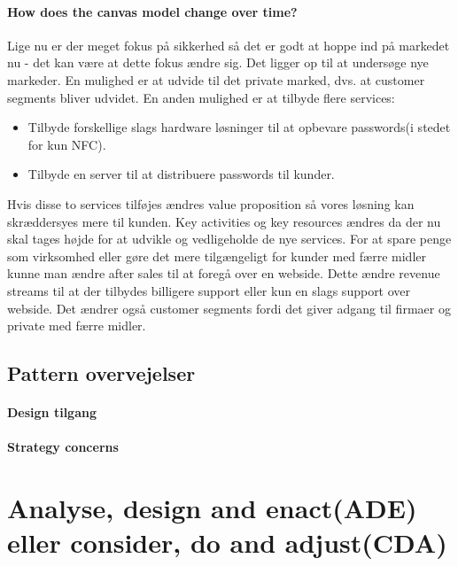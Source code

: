 \documentclass[a4paper]{article}
\begin{document}
\paragraph{How does the canvas model change over time?}
Lige nu er der meget fokus på sikkerhed så det er godt at hoppe ind på markedet nu - det kan være at dette fokus ændre sig.
Det ligger op til at undersøge nye markeder.
En mulighed er at udvide til det private marked, dvs. at customer segments bliver udvidet.
En anden mulighed er at tilbyde flere services:
\begin{itemize}
\item Tilbyde forskellige slags hardware løsninger til at opbevare passwords(i stedet for kun NFC).
\item Tilbyde en server til at distribuere passwords til kunder.
\end{itemize}
Hvis disse to services tilføjes ændres value proposition så vores løsning kan skræddersyes mere til kunden.
Key activities og key resources ændres da der nu skal tages højde for at udvikle og vedligeholde de nye services.
For at spare penge som virksomhed eller gøre det mere tilgængeligt for kunder med færre midler kunne man ændre after sales til at foregå over en webside.
Dette ændre revenue streams til at der tilbydes billigere support eller kun en slags support over webside.
Det ændrer også customer segments fordi det giver adgang til firmaer og private med færre midler.

\subsection{Pattern overvejelser}


\paragraph{Design tilgang}

\paragraph{Strategy concerns}

\section{Analyse, design and enact(ADE) eller consider, do and adjust(CDA)}

\end{document}

